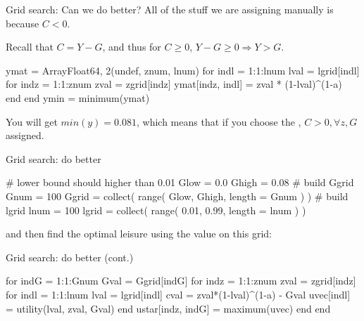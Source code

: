 \documentclass[11pt,aspectratio=43,usenames,dvipsnames]{beamer}
\theoremstyle{definition}
\begin{document}
\begin{frame}[fragile]{Grid search: Can we do better?}
\label{slide:Grid_search__Can_we_do_better_}
    All of the  stuff we are assigning manually is because $ C < 0 $.

    Recall that $ C = Y - G $, and thus for $ C \ge 0 $, $ Y - G \ge 0 \Rightarrow Y > G $.

\begin{juliacode}
    ymat = Array{Float64, 2}(undef, znum, lnum)
    for indl = 1:1:lnum
        lval = lgrid[indl]
        for indz = 1:1:znum
            zval = zgrid[indz]
            ymat[indz, indl] = zval * (1-lval)^(1-a)
        end
    end
    ymin = minimum(ymat)
\end{juliacode}

You will get $ min(y) = 0.081 $, which means that if you choose the , $ C > 0, \forall z, G $ assigned.

\end{frame}

\begin{frame}[fragile]{Grid search: do better}
\label{slide:Grid_search__do_better}

\begin{juliacode}
    # lower bound should higher than 0.01
    Glow = 0.0
    Ghigh = 0.08
    # build Ggrid
    Gnum = 100
    Ggrid = collect( range( Glow, Ghigh, length = Gnum ) )
    # build lgrid
    lnum = 100
    lgrid = collect( range( 0.01, 0.99, length = lnum ) )
\end{juliacode}

and then find the optimal leisure using the value on this grid:

\end{frame}

\begin{frame}[fragile]{Grid search: do better (cont.)}
\label{slide:Grid_search__do_better__cont_}

\begin{juliacode}
    for indG = 1:1:Gnum
        Gval = Ggrid[indG]
        for indz = 1:1:znum
            zval = zgrid[indz]
            for indl = 1:1:lnum
                lval = lgrid[indl]
                cval = zval*(1-lval)^(1-a) - Gval
                uvec[indl] = utility(lval, zval, Gval)
            end
            ustar[indz, indG] = maximum(uvec)
        end
    end
\end{juliacode}


\end{frame}
\end{document}
